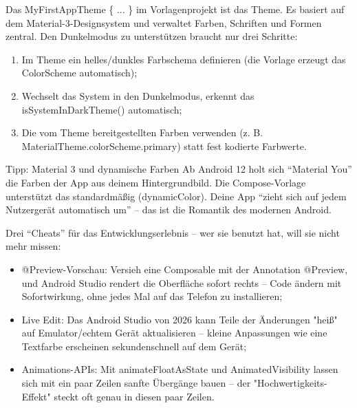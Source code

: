 
Das MyFirstAppTheme \{ ... \} im Vorlagenprojekt ist das Theme. Es basiert auf dem Material-3-Designsystem und verwaltet Farben, Schriften und Formen zentral. Den Dunkelmodus zu unterstützen braucht nur drei Schritte:

\begin{enumerate}
  \item Im Theme ein helles/dunkles Farbschema definieren (die Vorlage erzeugt das ColorScheme automatisch);
  \item Wechselt das System in den Dunkelmodus, erkennt das isSystemInDarkTheme() automatisch;
  \item Die vom Theme bereitgestellten Farben verwenden (z. B. MaterialTheme.colorScheme.primary) statt fest kodierte Farbwerte.
\end{enumerate}

\begin{tcbinfo}{Tipp: Material 3 und dynamische Farben}
Ab Android 12 holt sich “Material You” die Farben der App aus deinem Hintergrundbild. Die Compose-Vorlage unterstützt das standardmäßig (dynamicColor). Deine App “zieht sich auf jedem Nutzergerät automatisch um” – das ist die Romantik des modernen Android.

\end{tcbinfo}


Drei “Cheats” für das Entwicklungserlebnis – wer sie benutzt hat, will sie nicht mehr missen:

\begin{itemize}
  \item @Preview-Vorschau: Versieh eine Composable mit der Annotation @Preview, und Android Studio rendert die Oberfläche sofort rechts – Code ändern mit Sofortwirkung, ohne jedes Mal auf das Telefon zu installieren;
  \item Live Edit: Das Android Studio von 2026 kann Teile der Änderungen "heiß" auf Emulator/echtem Gerät aktualisieren – kleine Anpassungen wie eine Textfarbe erscheinen sekundenschnell auf dem Gerät;
  \item Animations-APIs: Mit animateFloatAsState und AnimatedVisibility lassen sich mit ein paar Zeilen sanfte Übergänge bauen – der "Hochwertigkeits-Effekt" steckt oft genau in diesen paar Zeilen.
\end{itemize}

